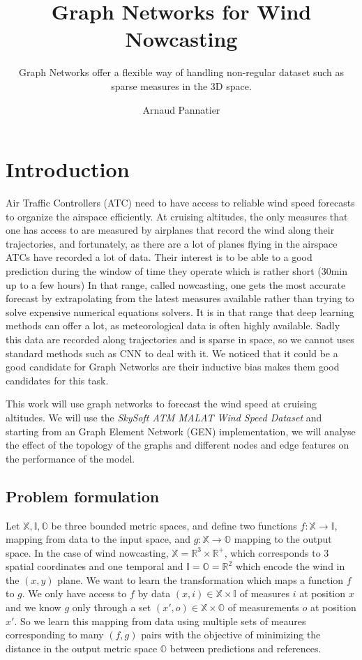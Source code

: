 \documentclass[a4paper,10pt]{article}
\title{Graph Networks for Wind Nowcasting}
\subtitle{ Graph Networks offer a flexible way of handling non-regular dataset such as sparse measures in the 3D space.}
\author{Arnaud Pannatier}
\begin{document}
\maketitle

\section{Introduction}
Air Traffic Controllers (ATC) need to have access to reliable wind speed forecasts to organize the airspace efficiently. At cruising altitudes, the only measures that one has access to are measured by airplanes that record the wind along their trajectories, and fortunately, as there are a lot of planes flying in the airspace ATCs have recorded a lot of data. Their interest is to be able to a good prediction during the window of time they operate which is rather short (30min up to a few hours) In that range, called nowcasting, one gets the most accurate forecast by extrapolating from the latest measures available rather than trying to solve expensive numerical equations solvers.
It is in that range that deep learning methods can offer a lot, as meteorological data is often highly available. Sadly this data are recorded along trajectories and is sparse in space, so we cannot uses standard methods such as CNN to deal with it. We noticed that it could be a good candidate for Graph Networks are their inductive bias makes them good candidates for this task.

This work will use graph networks to forecast the wind speed at cruising altitudes. We will use the \textit{SkySoft ATM MALAT Wind Speed Dataset} \cite{skysoft2021dataset} and starting from an Graph Element Network (GEN) \cite{alet2019gen} implementation, we will analyse the effect of the topology of the graphs and different nodes and edge features on the performance of the model.



\subsection{Problem formulation}

Let $\mathbb{X}, \mathbb{I}, \mathbb{O}$ be three bounded metric spaces, and define two functions $f : \mathbb{X}\rightarrow \mathbb{I}$, mapping from data to the input space, and $g : \mathbb{X}\rightarrow \mathbb{O}$ mapping to the output space.
In the case of wind nowcasting, $\mathbb{X} = \mathbb{R}^{3} \times \mathbb{R}^{+}$, which corresponds to 3 spatial coordinates and one temporal and $\mathbb{I} = \mathbb{O} = \mathbb{R}^{2}$ which encode the wind in the $(x,y)$ plane.
We want to learn the transformation which maps a function $f$ to $g$.
We only have access to $f$ by data $(x, i)  \in \mathbb{X} \times \mathbb{I}$ of measures $i$ at position $x$ and we know $g$ only through a set $(x', o) \in \mathbb{X} \times \mathbb{O}$ of measurements $o$ at position $x'$.
So we learn this mapping from data using multiple sets of meaures corresponding to many $(f,g)$ pairs with the objective of minimizing the distance in the output metric space $\mathbb{O}$ between predictions and references.
\end{document}
